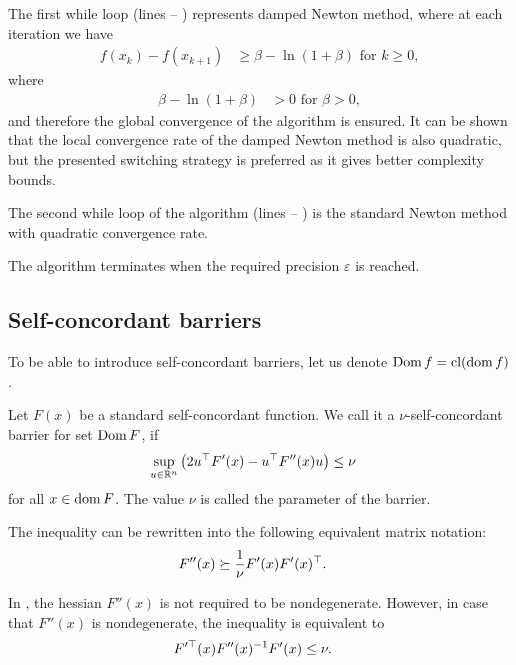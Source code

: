 The first while loop (lines  -- ) represents damped Newton method, where at each iteration we have
\begin{align}
  f(x_k) - f(x_{k+1}) &\geq \beta - \ln(1+\beta) \text{ for } k \geq 0,
\end{align}
where
\begin{align}
  \beta - \ln(1+\beta) &> 0 \text{ for } \beta > 0,
\end{align}
and therefore the global convergence of the algorithm is ensured.
It can be shown that the local convergence rate of the damped Newton method is also quadratic, but the presented switching strategy is preferred as it gives better complexity bounds.

The second while loop of the algorithm (lines  -- ) is the standard Newton method with quadratic convergence rate.

The algorithm terminates when the required precision $\varepsilon$ is reached.


\subsection{Self-concordant barriers}
To be able to introduce self-concordant barriers, let us denote $\operatorname{Dom} f = \operatorname{cl}(\operatorname{dom} f)$.

\begin{definition}
  Let $F(x)$ be a standard self-concordant function. We call it a $\nu$-self-concordant barrier for set $\operatorname{Dom} F$, if
  \begin{align}
    \sup_{u\in\R^n} \big(2u^\top F'(x) - u^\top F''(x) u\big) &\leq \nu \labeleq{SDP:scb:def}
  \end{align}
  for all $x\in\operatorname{dom} F$. The value $\nu$ is called the parameter of the barrier.
\end{definition}

The inequality  can be rewritten into the following equivalent matrix notation:
\begin{align}
  F''(x) &\succeq \frac{1}{\nu}F'(x)F'(x)^\top.\labeleq{SDP:scb:def1}
\end{align}

In , the hessian $F''(x)$ is not required to be nondegenerate. However, in case that $F''(x)$ is nondegenerate, the inequality  is equivalent to
\begin{align}
  F'^\top(x)F''(x)^{-1}F'(x) &\leq \nu.\labeleq{SDP:scb:def2}
\end{align}

